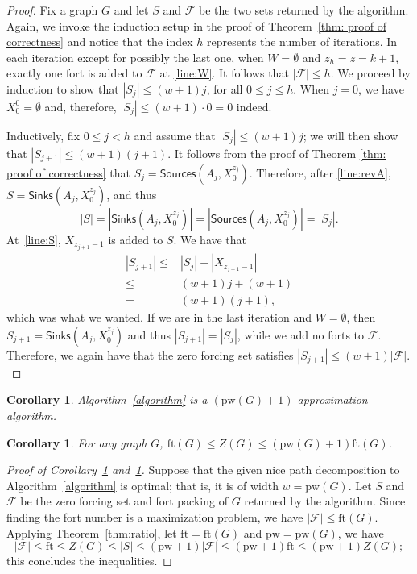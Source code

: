 \documentclass[12pt]{amsart}
\theoremstyle{plain}
\newtheorem{corollary}[theorem]{Corollary}
\theoremstyle{definition}
\def\F{\mathcal F}
\def\calF{\mathcal{F}}
\def\ft{\mathrm{ft}}
\def\pw{\mathrm{pw}}
\newcommand{\sources}{\mathsf{Sources}}
\newcommand{\sinks}{\mathsf{Sinks}}
\begin{document}
\begin{proof}
Fix a graph $G$ and let $S$ and $\calF$ be the two sets returned by the algorithm.
    Again, we invoke the induction setup in the proof of Theorem~\ref{thm: proof of correctness} and notice that the index $h$ represents the number of iterations. In each iteration except for possibly the last one, when $W=\emptyset$ and $z_h = z=k+1$, exactly one fort is added to $\F$ at \ref{line:W}. It follows that  $|\calF|\leq h$. 
    We proceed by induction to show that $|S_j|\leq (w+1)j$, for all $0\leq j\leq h$. 
    When $j = 0$, we have $X_0^0 = \emptyset$ and, therefore, $|S_j|\leq (w+1)\cdot0 = 0$ indeed. 
    
    Inductively, fix $0\leq j < h$ and assume that $|S_j|\leq (w+1)j$; 
    we will then show that $|S_{j+1}|\leq (w+1)(j+1)$.
    It follows from the proof of Theorem \ref{thm: proof of correctness} that $S_j=\sources(A_j, X_0^{z_j})$. Therefore, after \ref{line:revA}, $S=\sinks(A_j, X_0^{z_j})$, and thus 
    $$|S|=|\sinks(A_j, X_0^{z_j})|=|\sources(A_j, X_0^{z_j})|=|S_j|.$$ 
    At~\ref{line:S}, $X_{z_{j+1}-1}$ is added to $S$. We have that
\begin{align*}
    |S_{j+1}|  
        \leq & |S_j| + |X_{z_{j+1}-1}| \\
        \leq & (w+1)j + (w+1) \\ 
        = &  (w+1)(j+1),
\end{align*}
which was what we wanted. 
If we are in the last iteration and $W=\emptyset$, then $S_{j+1}=\sinks(A_j,X_0^{z_j})$ and thus $|S_{j+1}|=|S_j|$, while we add no forts to $\calF$. Therefore, we again have that the zero forcing set satisfies $|S_{j+1}|\leq (w+1)|\calF|.$ 
\end{proof}
\begin{corollary}\label{cor:factor}
    Algorithm~\ref{algorithm} is a $(\pw(G)+1)$-approximation algorithm. 
\end{corollary}
\begin{corollary}\label{cor:bound}
    For any graph $G$, $\ft(G)\leq Z(G)\leq(\pw(G)+1)\ft(G) $. 
\end{corollary}
\begin{proof}[Proof of Corollary~\ref{cor:factor} and~\ref{cor:bound}]
    Suppose that the given nice path decomposition to Algorithm~\ref{algorithm} is optimal; that is, it is of width $w = \pw(G)$.
    Let $S$ and $\F$ be the zero forcing set and fort packing of $G$ returned by the algorithm. 
    Since finding the fort number is a maximization problem, we have $|\F|\leq \ft(G)$. 
    Applying Theorem~\ref{thm:ratio}, let $\ft=\ft(G)$ and $\pw=\pw(G)$, we have 
    $$|\F|\leq \ft\leq Z(G)\leq |S|\leq (\pw+1)|\F|\leq (\pw+1)\ft\leq (\pw+1)Z(G);$$
    this concludes the inequalities. 
\end{proof}
\end{document}
